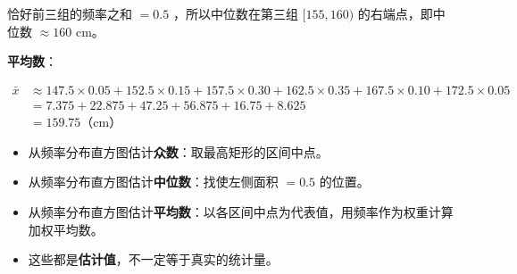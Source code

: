 \begin{workedexamples}
恰好前三组的频率之和 $= 0.5$ ，所以中位数在第三组 $[155, 160)$ 的右端点，即中位数 $\approx 160$ cm。

\textbf{平均数}：

\[
\begin{aligned}
\bar{x} &\approx 147.5 \times 0.05 + 152.5 \times 0.15 + 157.5 \times 0.30 + 162.5 \times 0.35 + 167.5 \times 0.10 + 172.5 \times 0.05 \\
&= 7.375 + 22.875 + 47.25 + 56.875 + 16.75 + 8.625 \\
&= 159.75 \text{（cm）}
\end{aligned}
\]


\end{workedexamples}

\begin{keytakeaway}


\begin{itemize}
  \item 从频率分布直方图估计\textbf{众数}：取最高矩形的区间中点。
  \item 从频率分布直方图估计\textbf{中位数}：找使左侧面积 $= 0.5$ 的位置。
  \item 从频率分布直方图估计\textbf{平均数}：以各区间中点为代表值，用频率作为权重计算加权平均数。
  \item 这些都是\textbf{估计值}，不一定等于真实的统计量。
\end{itemize}


\end{keytakeaway}

